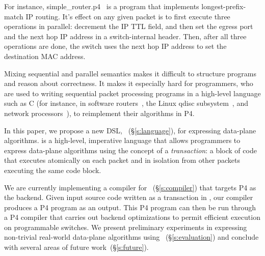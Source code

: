 For instance, simple\_router.p4~\cite{simple_router.p4} is a program that
implements longest-prefix-match IP routing. It's effect on any given packet is
to first execute three operations in parallel: decrement the IP TTL field, and
then set the egress port and the next hop IP address in a switch-internal
header.  Then, after all three operations are done, the switch uses the next
hop IP address to set the destination MAC address.

Mixing sequential and parallel semantics makes it difficult to structure
programs and reason about correctness. It makes it especially hard for
programmers, who are used to writing sequential packet processing programs in a
high-level language such as C (for instance, in software routers~\cite{click,
intel_multicore}, the Linux qdisc subsystem~\cite{qdisc}, and network
processors~\cite{npu}), to reimplement their algorithms in P4.

In this paper, we propose a new DSL, \pktlanguage~(\S\ref{s:language}), for
expressing data-plane algorithms. \pktlanguage is a high-level, imperative
language that allows programmers to express data-plane algorithms using the
concept of a {\em transaction}: a block of code that executes atomically on
each packet and in isolation from other packets executing the same code block.


%

We are currently implementing a compiler for \pktlanguage~(\S\ref{s:compiler})
that targets P4 as the backend. Given input source code written as a
transaction in \pktlanguage, our compiler produces a P4 program as an output.
This P4 program can then be run through a P4 compiler that carries out backend
optimizations to permit efficient execution on programmable switches.  We
present preliminary experiments in expressing non-trivial real-world data-plane
algorithms using \pktlanguage~(\S\ref{s:evaluation}) and conclude with several
areas of future work~(\S\ref{s:future}).
